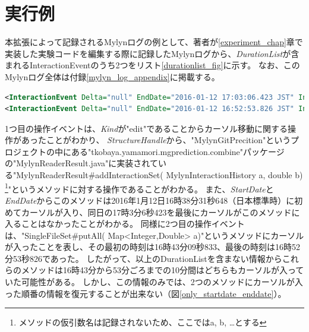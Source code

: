 \documentclass[a4paper]{jsbook}
\begin{document}
\section{実行例}
本拡張によって記録されるMylynログの例として、著者が\ref{experiment_chap}章で実装した実験コードを編集する際に記録したMylynログから、{\it DurationList}が含まれるInteractionEventのうち2つをリスト\ref{durationlist_fig}に示す。
なお、このMylynログ全体は付録\ref{mylyn_log_appendix}に掲載する。

\begin{lstlisting}[style=normalsize, language=xml, caption=拡張されたMylynによって記録されたMylynログの例（ただしXML上で実体参照に変換された文字はもとに戻している）, label=durationlist_fig]
<InteractionEvent Delta="null" EndDate="2016-01-12 17:03:06.423 JST" Interest="15.0" Kind="edit" Navigation="null" OriginId="org.eclipse.jdt.ui.CompilationUnitEditor" StartDate="2016-01-12 16:38:31.648 JST" StructureHandle="=MylynGitPrediction/src<tkobaya.yamamori.mgprediction.combine{MylynReaderResult.java[MylynReaderResult~ addInteractionSet~QMylynInteractionHistory;~D" StructureKind="java" NumEvents="15" CreationCount="103" DurationList= "[2016-01-12 16:38:31.648 JST/2016-01-12 16:40:16.482 JST/modified, 2016-01-12 17:02:58.409 JST/2016-01-12 17:03:06.423 JST/modified]"/>
<InteractionEvent Delta="null" EndDate="2016-01-12 16:52:53.826 JST" Interest="29.0" Kind="edit" Navigation="null" OriginId="org.eclipse.jdt.ui.CompilationUnitEditor" StartDate="2016-01-12 16:43:09.833 JST" StructureHandle="= MylynGitPrediction/src<tkobaya.yamamori.mgprediction.combine{SingleFileSet.java[SingleFileSet~putAll~QMap<+QInteger;+QDouble;>;" StructureKind="java" NumEvents="29" CreationCount="157" DurationList=" [2016-01-12 16:43:09.833 JST/2016-01-12 16:43:11.666 JST/referred, 2016-01-12 16:51:14.131 JST/2016-01-12 16:51:14.131 JST/referred, 2016-01-12 16:51:38.25 JST/2016-01-12 16:52:53.826 JST/modified]"/>
\end{lstlisting}

1つ目の操作イベントは、{\it Kind}が"edit"であることからカーソル移動に関する操作があったことがわかり、
{\it StructureHandle}から、"MylynGitPrecition"というプロジェクトの中にある"tkobaya.yamamori.mgprediction.combine"パッケージの"MylynReaderResult.java"に実装されている"MylynReaderResult\#addInteractionSet( MylynInteractionHistory a, double b)
\footnote{メソッドの仮引数名は記録されないため、ここではa, b, \dots とする}"というメソッドに対する操作であることがわかる。
また、{\it StartDate}と{\it EndDate}からこのメソッドは2016年1月12日16時38分31秒648（日本標準時）に初めてカーソルが入り、同日の17時3分6秒423を最後にカーソルがこのメソッドに入ることはなかったことがわかる。
同様に2つ目の操作イベントは、"SingleFileSet\#putAll( Map<Integer,Double> a)"というメソッドにカーソルが入ったことを表し、その最初の時刻は16時43分09秒833、最後の時刻は16時52分53秒826であった。
したがって、以上のDurationListを含まない情報からこれらのメソッドは16時43分から53分ごろまでの10分間はどちらもカーソルが入っていた可能性がある。
しかし、この情報のみでは、2つのメソッドにカーソルが入った順番の情報を復元することが出来ない（図\ref{only_startdate_enddate}）。
\end{document}
